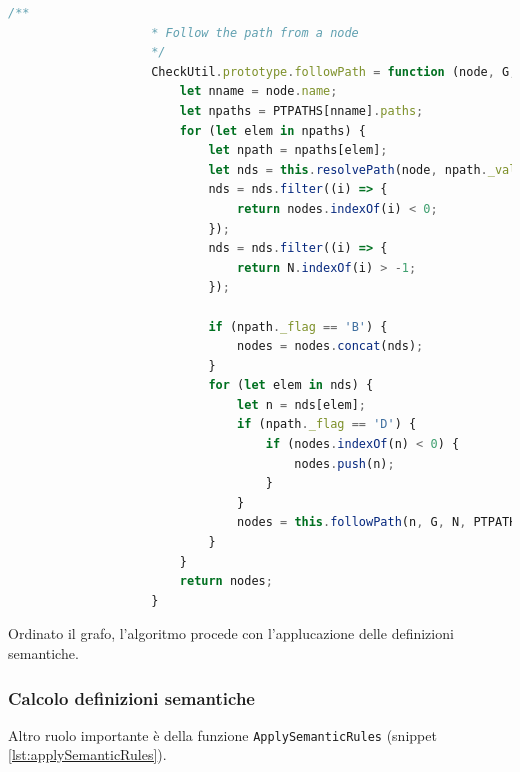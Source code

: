                 \begin{lstlisting}[language=JavaScript, basicstyle=\tiny, caption={La funzione followPath}, label={lst:followPath}]
                    /**
                    * Follow the path from a node
                    */
                    CheckUtil.prototype.followPath = function (node, G, N, PTPATHS, nodes) {
                        let nname = node.name;
                        let npaths = PTPATHS[nname].paths;
                        for (let elem in npaths) {
                            let npath = npaths[elem];
                            let nds = this.resolvePath(node, npath._value);
                            nds = nds.filter((i) => {
                                return nodes.indexOf(i) < 0;
                            });
                            nds = nds.filter((i) => {
                                return N.indexOf(i) > -1;
                            });

                            if (npath._flag == 'B') {
                                nodes = nodes.concat(nds);
                            }
                            for (let elem in nds) {
                                let n = nds[elem];
                                if (npath._flag == 'D') {
                                    if (nodes.indexOf(n) < 0) {
                                        nodes.push(n);
                                    }
                                }
                                nodes = this.followPath(n, G, N, PTPATHS, nodes);
                            }
                        }
                        return nodes;
                    }
                \end{lstlisting}

                Ordinato il grafo, l'algoritmo procede con l'applucazione delle definizioni semantiche.
                
            \subsubsection{Calcolo definizioni semantiche}
                Altro ruolo importante è della funzione \texttt{ApplySemanticRules} (snippet \ref{lst:applySemanticRules}).

